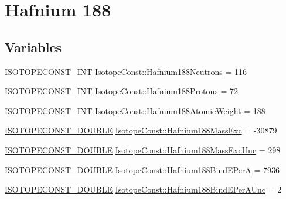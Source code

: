 \hypertarget{group___isotope_const-_hafnium-_hf188}{}\section{Hafnium 188}
\label{group___isotope_const-_hafnium-_hf188}
\subsection*{Variables}
\begin{DoxyCompactItemize}
\item 
\mbox{\hyperlink{group___isotope_const-_macros_ga5f18360b3e99483a35c32d789e62621c}{I\+S\+O\+T\+O\+P\+E\+C\+O\+N\+S\+T\+\_\+\+I\+NT}} \mbox{\hyperlink{group___isotope_const-_hafnium-_hf188_gae71b171d96247a138393f4f4c5a46a06}{Isotope\+Const\+::\+Hafnium188\+Neutrons}} = 116
\item 
\mbox{\hyperlink{group___isotope_const-_macros_ga5f18360b3e99483a35c32d789e62621c}{I\+S\+O\+T\+O\+P\+E\+C\+O\+N\+S\+T\+\_\+\+I\+NT}} \mbox{\hyperlink{group___isotope_const-_hafnium-_hf188_ga321927ed1afe34b18d69528320087a98}{Isotope\+Const\+::\+Hafnium188\+Protons}} = 72
\item 
\mbox{\hyperlink{group___isotope_const-_macros_ga5f18360b3e99483a35c32d789e62621c}{I\+S\+O\+T\+O\+P\+E\+C\+O\+N\+S\+T\+\_\+\+I\+NT}} \mbox{\hyperlink{group___isotope_const-_hafnium-_hf188_gaf9a0f014a4803d87e67debad0b239f9f}{Isotope\+Const\+::\+Hafnium188\+Atomic\+Weight}} = 188
\item 
\mbox{\hyperlink{group___isotope_const-_macros_ga8f45a7272ce02c0b4c65c44636ed719a}{I\+S\+O\+T\+O\+P\+E\+C\+O\+N\+S\+T\+\_\+\+D\+O\+U\+B\+LE}} \mbox{\hyperlink{group___isotope_const-_hafnium-_hf188_gad6e958325f535106dea974f1c3708ac0}{Isotope\+Const\+::\+Hafnium188\+Mass\+Exc}} = -\/30879
\item 
\mbox{\hyperlink{group___isotope_const-_macros_ga8f45a7272ce02c0b4c65c44636ed719a}{I\+S\+O\+T\+O\+P\+E\+C\+O\+N\+S\+T\+\_\+\+D\+O\+U\+B\+LE}} \mbox{\hyperlink{group___isotope_const-_hafnium-_hf188_ga686827c8154d4652f187ae08ec3051dc}{Isotope\+Const\+::\+Hafnium188\+Mass\+Exc\+Unc}} = 298
\item 
\mbox{\hyperlink{group___isotope_const-_macros_ga8f45a7272ce02c0b4c65c44636ed719a}{I\+S\+O\+T\+O\+P\+E\+C\+O\+N\+S\+T\+\_\+\+D\+O\+U\+B\+LE}} \mbox{\hyperlink{group___isotope_const-_hafnium-_hf188_ga05860018dd0cce1c01367a3e77cf94c0}{Isotope\+Const\+::\+Hafnium188\+Bind\+E\+PerA}} = 7936
\item 
\mbox{\hyperlink{group___isotope_const-_macros_ga8f45a7272ce02c0b4c65c44636ed719a}{I\+S\+O\+T\+O\+P\+E\+C\+O\+N\+S\+T\+\_\+\+D\+O\+U\+B\+LE}} \mbox{\hyperlink{group___isotope_const-_hafnium-_hf188_ga0639263bcd82f76159908072b642ba3c}{Isotope\+Const\+::\+Hafnium188\+Bind\+E\+Per\+A\+Unc}} = 2

\end{DoxyCompactItemize}
